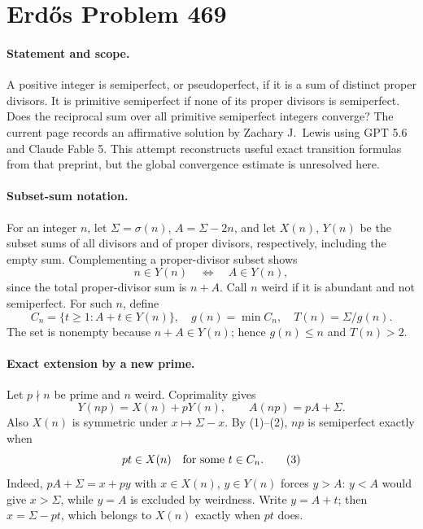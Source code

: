 \section*{Erd\H{o}s Problem 469}

\paragraph{Statement and scope.}
A positive integer is semiperfect, or pseudoperfect, if it is a sum of
distinct proper divisors. It is primitive semiperfect if none of its
proper divisors is semiperfect. Does the reciprocal sum over all
primitive semiperfect integers converge?
The current page records an affirmative solution by Zachary J.~Lewis
using GPT 5.6 and Claude Fable 5. This attempt reconstructs useful
exact transition formulas from that preprint, but the global
convergence estimate is unresolved here.

\paragraph{Subset-sum notation.}
For an integer \(n\), let \(\Sigma=\sigma(n)\), \(A=\Sigma-2n\),
and let \(X(n)\), \(Y(n)\) be the subset sums of all divisors and
of proper divisors, respectively, including the empty sum.
Complementing a proper-divisor subset shows
\[
 n\in Y(n)\quad\Longleftrightarrow\quad A\in Y(n),
 \tag{1}
\]
since the total proper-divisor sum is \(n+A\).
Call \(n\) weird if it is abundant and not semiperfect.
For such \(n\), define
\[
 C_n=\{t\geq1:A+t\in Y(n)\},\quad
 g(n)=\min C_n,\quad T(n)=\Sigma/g(n).
\]
The set is nonempty because \(n+A\in Y(n)\); hence \(g(n)\leq n\)
and \(T(n)>2\).

\paragraph{Exact extension by a new prime.}
Let \(p\nmid n\) be prime and \(n\) weird. Coprimality gives
\[
 Y(np)=X(n)+pY(n),\qquad A(np)=pA+\Sigma.
 \tag{2}
\]
Also \(X(n)\) is symmetric under \(x\mapsto\Sigma-x\).
By (1)--(2), \(np\) is semiperfect exactly when
\[
 pt\in X(n)\quad\hbox{for some }t\in C_n.
 \tag{3}
\]
Indeed, \(pA+\Sigma=x+py\) with \(x\in X(n)\), \(y\in Y(n)\)
forces \(y>A\): \(y<A\) would give \(x>\Sigma\), while \(y=A\)
is excluded by weirdness. Write \(y=A+t\); then \(x=\Sigma-pt\),
which belongs to \(X(n)\) exactly when \(pt\) does.

